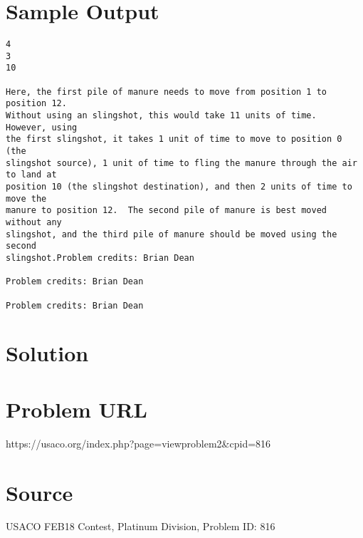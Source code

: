 \documentclass[12pt]{article}
\begin{document}
\section*{Sample Output}
\begin{verbatim}
4
3
10

Here, the first pile of manure needs to move from position 1 to position 12. 
Without using an slingshot, this would take 11 units of time.  However, using
the first slingshot, it takes 1 unit of time to move to position 0 (the
slingshot source), 1 unit of time to fling the manure through the air to land at
position 10 (the slingshot destination), and then 2 units of time to move the
manure to position 12.  The second pile of manure is best moved without any
slingshot, and the third pile of manure should be moved using the second
slingshot.Problem credits: Brian Dean

Problem credits: Brian Dean

Problem credits: Brian Dean
\end{verbatim}

\section*{Solution}


\section*{Problem URL}
https://usaco.org/index.php?page=viewproblem2&cpid=816

\section*{Source}
USACO FEB18 Contest, Platinum Division, Problem ID: 816
\end{document}
